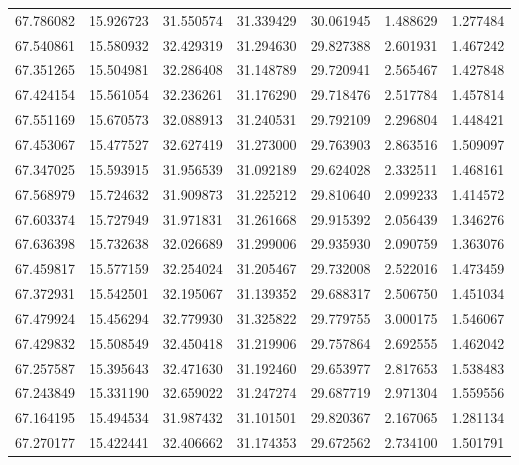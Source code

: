 \begin{tabular}{rrrrrrr}
 67.786082 &  15.926723 &         31.550574 &         31.339429 &         30.061945 &  1.488629 &  1.277484 \\
 67.540861 &  15.580932 &         32.429319 &         31.294630 &         29.827388 &  2.601931 &  1.467242 \\
 67.351265 &  15.504981 &         32.286408 &         31.148789 &         29.720941 &  2.565467 &  1.427848 \\
 67.424154 &  15.561054 &         32.236261 &         31.176290 &         29.718476 &  2.517784 &  1.457814 \\
 67.551169 &  15.670573 &         32.088913 &         31.240531 &         29.792109 &  2.296804 &  1.448421 \\
 67.453067 &  15.477527 &         32.627419 &         31.273000 &         29.763903 &  2.863516 &  1.509097 \\
 67.347025 &  15.593915 &         31.956539 &         31.092189 &         29.624028 &  2.332511 &  1.468161 \\
 67.568979 &  15.724632 &         31.909873 &         31.225212 &         29.810640 &  2.099233 &  1.414572 \\
 67.603374 &  15.727949 &         31.971831 &         31.261668 &         29.915392 &  2.056439 &  1.346276 \\
 67.636398 &  15.732638 &         32.026689 &         31.299006 &         29.935930 &  2.090759 &  1.363076 \\
 67.459817 &  15.577159 &         32.254024 &         31.205467 &         29.732008 &  2.522016 &  1.473459 \\
 67.372931 &  15.542501 &         32.195067 &         31.139352 &         29.688317 &  2.506750 &  1.451034 \\
 67.479924 &  15.456294 &         32.779930 &         31.325822 &         29.779755 &  3.000175 &  1.546067 \\
 67.429832 &  15.508549 &         32.450418 &         31.219906 &         29.757864 &  2.692555 &  1.462042 \\
 67.257587 &  15.395643 &         32.471630 &         31.192460 &         29.653977 &  2.817653 &  1.538483 \\
 67.243849 &  15.331190 &         32.659022 &         31.247274 &         29.687719 &  2.971304 &  1.559556 \\
 67.164195 &  15.494534 &         31.987432 &         31.101501 &         29.820367 &  2.167065 &  1.281134 \\
 67.270177 &  15.422441 &         32.406662 &         31.174353 &         29.672562 &  2.734100 &  1.501791 \\

\end{tabular}
